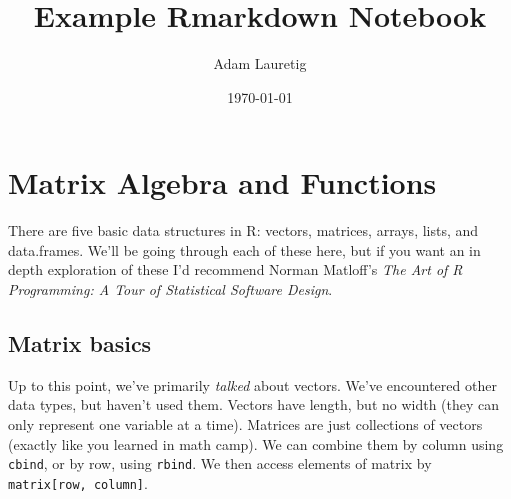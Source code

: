\documentclass[]{article}
\title{Example Rmarkdown Notebook}
\author{Adam Lauretig}
\date{\today}
\begin{document}
\maketitle

\section{Matrix Algebra and
Functions}\label{matrix-algebra-and-functions}

There are five basic data structures in R: vectors, matrices, arrays,
lists, and data.frames. We'll be going through each of these here, but
if you want an in depth exploration of these I'd recommend Norman
Matloff's \emph{The Art of R Programming: A Tour of Statistical Software
Design}.

\subsection{Matrix basics}\label{matrix-basics}

Up to this point, we've primarily \emph{talked} about vectors. We've
encountered other data types, but haven't used them. Vectors have
length, but no width (they can only represent one variable at a time).
Matrices are just collections of vectors (exactly like you learned in
math camp). We can combine them by column using \texttt{cbind}, or by
row, using \texttt{rbind}. We then access elements of matrix by
\texttt{matrix[row, column]}.
\end{document}

